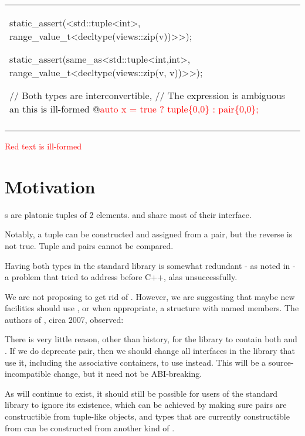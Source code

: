 \documentclass{wg21}
\begin{document}
\begin{center}
\begin{tabular}{l|l}
\begin{minipage}[t]{0.5\textwidth}
\begin{colorblock}
static_assert(<std::tuple<int>,
    range_value_t<decltype(views::zip(v))>>);

static_assert(same_as<std::tuple<int,int>,
    range_value_t<decltype(views::zip(v, v))>>);
    
    
    
    
// Both types are interconvertible,
// The expression is ambiguous an this is ill-formed
@\textcolor{red}{auto x = true ?  tuple\{0,0\} : pair\{0,0\};} 

\end{colorblock}
\end{minipage}
\\\\ \hline

\end{tabular}
\end{center}

\textcolor{red}{Red text is ill-formed}

\section{Motivation}

s are platonic tuples of 2 elements.  and  share
most of their interface.

Notably, a tuple can be constructed and assigned from a pair, but the reverse is not true.
Tuple and pairs cannot be compared.

Having both types in the standard library is somewhat redundant - as noted in  - a problem that 
tried to address before C++, alas unsuccessfully.

We are not proposing to get rid of .
However, we are suggesting that maybe new facilities should use , or when appropriate, a structure with named members.
The authors of , circa 2007, observed:

\begin{quoteblock}
There is very little reason, other than history, for the library to contain both  and . If we do deprecate pair, then we should change all interfaces in the library that use it, including the associative containers, to use  instead. This will be a source-incompatible change, but it need not be ABI-breaking.
\end{quoteblock}

As  will continue to exist, it should still be possible for users of the standard library to ignore its existence, which can be achieved by making sure pairs are constructible from tuple-like objects, and types that are currently constructible from  can be constructed from another kind of .
\end{document}
